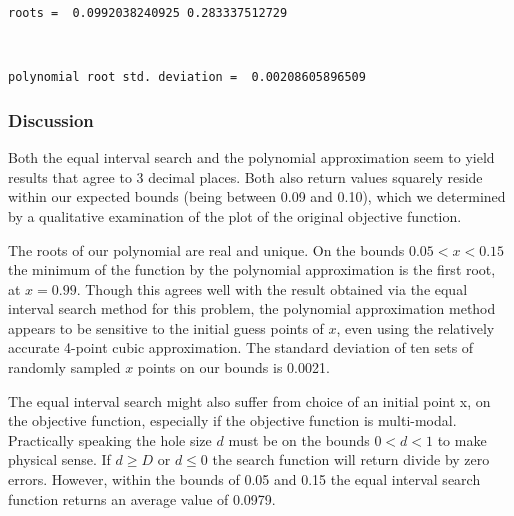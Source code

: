 \documentclass{article}
\begin{document}
    \begin{Verbatim}[commandchars=\\\{\}]
roots =  0.0992038240925 0.283337512729
    \end{Verbatim}

    \begin{center}
    \end{center}
    { \hspace*{\fill} \\}
    
    \begin{Verbatim}[commandchars=\\\{\}]
polynomial root std. deviation =  0.00208605896509
    \end{Verbatim}

    \subsubsection*{Discussion}\label{discussion}

Both the equal interval search and the polynomial approximation seem to
yield results that agree to 3 decimal places. Both also return values
squarely reside within our expected bounds (being between 0.09 and
0.10), which we determined by a qualitative examination of the plot of
the original objective function.

The roots of our polynomial are real and unique. On the bounds
$0.05<x<0.15$ the minimum of the function by the polynomial
approximation is the first root, at $x=0.99$. Though this agrees well
with the result obtained via the equal interval search method for this
problem, the polynomial approximation method appears to be sensitive to
the initial guess points of $x$, even using the relatively accurate
4-point cubic approximation. The standard deviation of ten sets of
randomly sampled $x$ points on our bounds is 0.0021.

The equal interval search might also suffer from choice of an initial
point x, on the objective function, especially if the objective function
is multi-modal. Practically speaking the hole size $d$ must be on the
bounds $0<d<1$ to make physical sense. If $d \geq D$ or $d \leq 0$ the
search function will return divide by zero errors. However, within the
bounds of 0.05 and 0.15 the equal interval search function returns an
average value of 0.0979.


    
    
    
    
\end{document}
